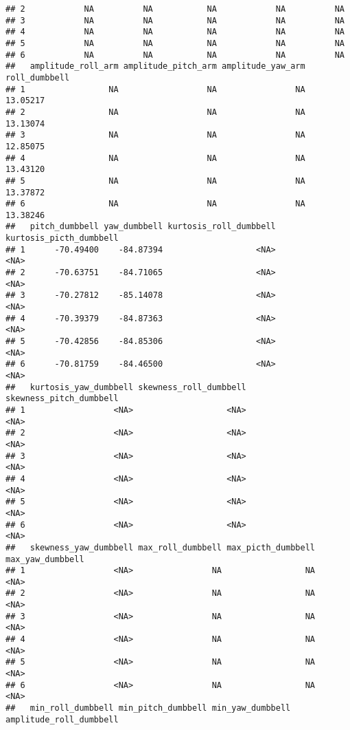 \documentclass[
]{article}
\begin{document}
\begin{verbatim}
## 2            NA          NA           NA            NA          NA
## 3            NA          NA           NA            NA          NA
## 4            NA          NA           NA            NA          NA
## 5            NA          NA           NA            NA          NA
## 6            NA          NA           NA            NA          NA
##   amplitude_roll_arm amplitude_pitch_arm amplitude_yaw_arm roll_dumbbell
## 1                 NA                  NA                NA      13.05217
## 2                 NA                  NA                NA      13.13074
## 3                 NA                  NA                NA      12.85075
## 4                 NA                  NA                NA      13.43120
## 5                 NA                  NA                NA      13.37872
## 6                 NA                  NA                NA      13.38246
##   pitch_dumbbell yaw_dumbbell kurtosis_roll_dumbbell kurtosis_picth_dumbbell
## 1      -70.49400    -84.87394                   <NA>                    <NA>
## 2      -70.63751    -84.71065                   <NA>                    <NA>
## 3      -70.27812    -85.14078                   <NA>                    <NA>
## 4      -70.39379    -84.87363                   <NA>                    <NA>
## 5      -70.42856    -84.85306                   <NA>                    <NA>
## 6      -70.81759    -84.46500                   <NA>                    <NA>
##   kurtosis_yaw_dumbbell skewness_roll_dumbbell skewness_pitch_dumbbell
## 1                  <NA>                   <NA>                    <NA>
## 2                  <NA>                   <NA>                    <NA>
## 3                  <NA>                   <NA>                    <NA>
## 4                  <NA>                   <NA>                    <NA>
## 5                  <NA>                   <NA>                    <NA>
## 6                  <NA>                   <NA>                    <NA>
##   skewness_yaw_dumbbell max_roll_dumbbell max_picth_dumbbell max_yaw_dumbbell
## 1                  <NA>                NA                 NA             <NA>
## 2                  <NA>                NA                 NA             <NA>
## 3                  <NA>                NA                 NA             <NA>
## 4                  <NA>                NA                 NA             <NA>
## 5                  <NA>                NA                 NA             <NA>
## 6                  <NA>                NA                 NA             <NA>
##   min_roll_dumbbell min_pitch_dumbbell min_yaw_dumbbell amplitude_roll_dumbbell

\end{verbatim}
\end{document}
